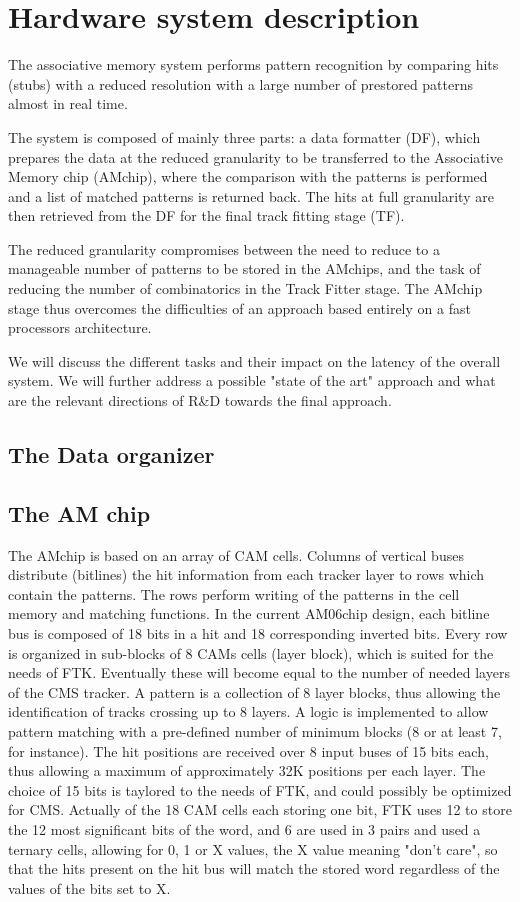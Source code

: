 \section{Hardware system description}

The associative memory system performs pattern recognition by comparing hits (stubs) with a reduced resolution with a large number
of prestored patterns almost in real time. 

The system is composed of mainly three parts: a data formatter (DF), which prepares the data at the reduced granularity to be transferred 
to the Associative Memory chip (AMchip), where the comparison with the patterns is performed and a list of matched patterns
is returned back. The hits at full granularity are then retrieved from the DF for the final track fitting stage (TF).

The reduced granularity compromises between the need to reduce to a manageable number of patterns to be stored in the AMchips, 
and the task of reducing the number of combinatorics in the Track Fitter stage. The AMchip stage thus overcomes the difficulties
of an approach based entirely on a fast processors architecture.

We will discuss the different tasks and their impact on the latency of the overall system. We will further address
a possible "state of the art" approach and what are the relevant directions of R\&D towards the final approach.


\subsection{The Data organizer}

\subsection{The AM chip}
The AMchip is based on an array of CAM cells. Columns of vertical buses distribute (bitlines) the hit information from each 
tracker layer to rows which contain the patterns. The rows perform writing of the patterns in the cell memory and matching 
functions. In the current AM06chip design, each bitline bus is composed of 18 bits in a hit and 18 corresponding inverted bits.
Every row is organized in sub-blocks of 8 CAMs cells (layer block), which is suited for the needs of FTK. Eventually these
will become equal to the number of needed layers of the CMS tracker. A pattern is a collection of 8 layer blocks, thus allowing
the identification of tracks crossing up to 8 layers. A logic is implemented to allow pattern matching with a pre-defined 
number of minimum blocks (8 or at least 7, for instance). The hit positions are received over 8 input buses of 15 bits each,
thus allowing a maximum of approximately 32K positions per each layer. The choice of 15 bits is taylored to the needs of FTK,
and could possibly be optimized for CMS. Actually of the 18 CAM cells each storing one bit, FTK uses 12 to store the 
12 most significant bits of the word, and 6 are used in 3 pairs and used a ternary cells, allowing for 0, 1 or X values, the 
X value meaning "don't care", so that the hits present on the hit bus will match the stored word regardless of the values
of the bits set to X. 


